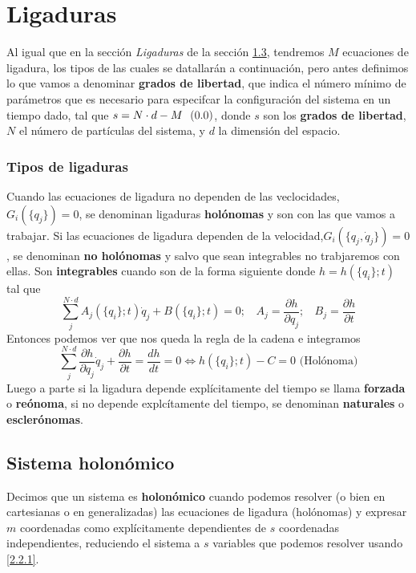 \section{Ligaduras}
Al igual que en la sección \textit{Ligaduras} de la sección \hyperref[sec:1.3]{1.3}, tendremos $M$ ecuaciones de ligadura, los tipos de las cuales se datallarán a continuación, pero antes definimos lo que vamos a denominar \textbf{grados de libertad}, que indica el número mínimo de parámetros que es necesario para especifcar la configuración del sistema en un tiempo dado, tal que $s = N\cdot d- M \label{2.3.1} \inlineeqnum$, donde $s$ son los \textbf{grados de libertad}, $N$ el número de partículas del sistema, y $d$ la dimensión del espacio.
\subsubsection{Tipos de ligaduras}
Cuando las ecuaciones de ligadura no dependen de las veclocidades, $G_i(\{q_j\})=0$, se denominan ligaduras \textbf{holónomas} y son con las que vamos a trabajar. Si las ecuaciones de ligadura dependen de la velocidad,$ G_i(\{q_j,\dot{q}_j\})=0$, se denominan \textbf{no holónomas} y salvo que sean integrables no trabjaremos con ellas. Son \textbf{integrables} cuando son de la forma siguiente donde $h=h(\{q_i\};t)$ tal que
\begin{equation} \label{2.3.2}
    \sum_j^{N\cdot d}{A_j(\{q_i\};t)\dot{q}_j} + B(\{q_i\};t)=0; \ \ \ \ A_j=\frac{\partial h}{\partial q_j}; \ \ \ \ B_j=\frac{\partial h}{\partial t}
\end{equation} 
Entonces podemos ver que nos queda la regla de la cadena e integramos
\begin{equation} \label{2.3.3}
    \sum_j^{N\cdot d}{\frac{\partial h}{\partial q_j}\dot{q}_j} + \frac{\partial h}{\partial t}=\frac{d h}{dt} =0 \iff h(\{q_i\};t) - C = 0 \mbox{ (Holónoma)}
\end{equation} 
Luego a parte si la ligadura depende explícitamente del tiempo se llama \textbf{forzada} o \textbf{reónoma}, si no depende explcítamente del tiempo, se denominan \textbf{naturales} o \textbf{esclerónomas}.

\newpage
\subsection{Sistema holonómico}
Decimos que un sistema es \textbf{holonómico} cuando podemos resolver (o bien en cartesianas o en generalizadas) las ecuaciones de ligadura (holónomas) y expresar $m$ coordenadas como explícitamente dependientes de $s$ coordenadas independientes, reduciendo el sistema a $s$ variables que podemos resolver usando \eqref{2.2.1}.
